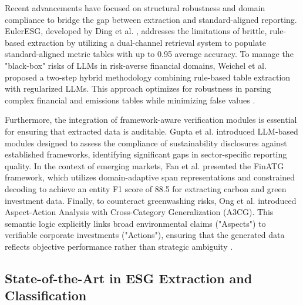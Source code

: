 \documentclass{article}
\begin{document}
Recent advancements have focused on structural robustness and domain compliance to bridge the gap between extraction and standard-aligned reporting. EulerESG, developed by Ding et al.  \parencite{yi_ding_136f177b}, addresses the limitations of brittle, rule-based extraction by utilizing a dual-channel retrieval system to populate standard-aligned metric tables with up to 0.95 average accuracy. To manage the "black-box" risks of LLMs in risk-averse financial domains, Weichel et al.  \parencite{hendrik_weichel_5ea70935} proposed a two-step hybrid methodology combining rule-based table extraction with regularized LLMs. This approach optimizes for robustness in parsing complex financial and emissions tables while minimizing false values  \parencite{hendrik_weichel_5ea70935}.

Furthermore, the integration of framework-aware verification modules is essential for ensuring that extracted data is auditable. Gupta et al.  \parencite{tanay_gupta_b5c91517} introduced LLM-based modules designed to assess the compliance of sustainability disclosures against established frameworks, identifying significant gaps in sector-specific reporting quality. In the context of emerging markets, Fan et al.  \parencite{j__h__fan_97bd591d} presented the FinATG framework, which utilizes domain-adaptive span representations and constrained decoding to achieve an entity F1 score of 88.5 for extracting carbon and green investment data. Finally, to counteract greenwashing risks, Ong et al.  \parencite[]{keane_ong_369a0b63, keane_ong_369a0b63} introduced Aspect-Action Analysis with Cross-Category Generalization (A3CG). This semantic logic explicitly links broad environmental claims ("Aspects") to verifiable corporate investments ("Actions"), ensuring that the generated data reflects objective performance rather than strategic ambiguity  \parencite[]{keane_ong_369a0b63, keane_ong_369a0b63}.
\subsection{State-of-the-Art in ESG Extraction and Classification}
\end{document}
